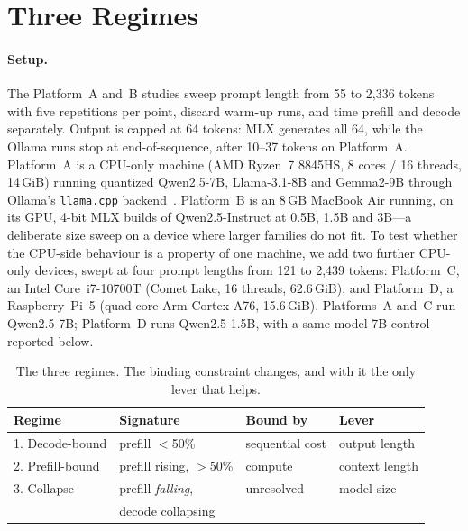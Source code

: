 \documentclass[sigconf,nonacm,10pt]{acmart}
\begin{document}
\section{Three Regimes}
\label{sec:three}

\paragraph{Setup.} The Platform~A and~B studies sweep prompt length from 55 to 2{,}336 tokens with five
repetitions per point, discard warm-up runs, and time prefill and decode separately. Output is capped at 64
tokens: MLX generates all 64, while the Ollama runs stop at end-of-sequence, after 10--37 tokens on Platform~A. Platform~A is a CPU-only machine
(AMD Ryzen~7 8845HS, 8 cores / 16 threads, 14\,GiB) running quantized Qwen2.5-7B, Llama-3.1-8B and Gemma2-9B
through Ollama's \texttt{llama.cpp} backend~\cite{gerganov2023llamacpp}. Platform~B is an 8\,GB MacBook Air running, on its GPU, 4-bit MLX
builds of Qwen2.5-Instruct at 0.5B, 1.5B and 3B---a deliberate size sweep on a device where larger families do
not fit. To test whether the CPU-side behaviour is a property of
one machine, we add two further CPU-only devices, swept at four prompt lengths from 121 to 2{,}439 tokens: Platform~C, an Intel Core~i7-10700T (Comet Lake, 16
threads, 62.6\,GiB), and Platform~D, a Raspberry~Pi~5 (quad-core Arm Cortex-A76, 15.6\,GiB). Platforms~A
and~C run Qwen2.5-7B; Platform~D runs Qwen2.5-1.5B, with a same-model 7B control reported below.

\begin{table}[t]
\caption{The three regimes. The binding constraint changes, and with it the only lever that helps.}
\label{tab:regimes}
\footnotesize
\setlength{\tabcolsep}{3.5pt}
\begin{tabular}{@{}llll@{}}
\toprule
\textbf{Regime} & \textbf{Signature} & \textbf{Bound by} & \textbf{Lever} \\
\midrule
1. Decode-bound  & prefill $<$50\%              & sequential cost & output length \\
2. Prefill-bound & prefill rising, $>$50\%      & compute         & context length \\
3. Collapse      & prefill \emph{falling},      & unresolved      & model size \\
                 & decode collapsing            &                 &            \\
\bottomrule
\end{tabular}
\end{table}
\end{document}
